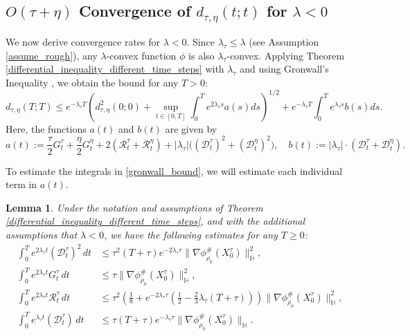 \documentclass[11pt,a4paper]{amsart}
\newcommand{\1}{\mathds{1}}
\newtheorem{lemma}[theorem]{\textbf{Lemma}}
\numberwithin{equation}{section}
\begin{document}
\subsection{ $O(\tau + \eta)$ Convergence of $d_{\tau,\eta}(t;t)$ for $\lambda < 0$ }

We now derive convergence rates for $\lambda < 0$. Since $\lambda_{\tau} \leq \lambda$ (see Assumption \ref{assume_rough}), any $\lambda$-convex function $\phi$ is also $\lambda_{\tau}$-convex. Applying Theorem \ref{differential_inequality_different_time_steps} with $\lambda_{\tau}$ and using Gronwall’s Inequality \cite[Lemma 4.1.8]{ambrosio2005gradient}, we obtain the bound  
for any $T > 0$:  
\begin{equation}
    d_{\tau,\eta}(T;T) \leq e^{- \lambda_{\tau} T} \left( d^2_{\tau,\eta}(0;0) + \sup_{t \in [0,T]} \int_0^T e^{2 \lambda_{\tau} s} a(s) ds \right)^{1/2} 
    + e^{- \lambda_{\tau} T}\int_0^T e^{\lambda_{\tau} s} b(s) ds.
    \label{gronwall_bound}
\end{equation}
Here, the functions $a(t)$ and $b(t)$ are given by  
\[
a(t) :=  \frac{\tau}{2}  G^{\tau}_t + \frac{\eta}{2} G^{\eta}_t  + 2( \mathcal{R}_t^{\tau} + \mathcal{R}_t^{\eta}) + |\lambda_{\tau}| \big( (\mathcal{D}_t^{\tau})^2 + (\mathcal{D}_t^{\eta})^2 \big),
\quad
b(t) := |\lambda_{\tau}| \cdot(\mathcal{D}_t^{\tau} + \mathcal{D}_t^{\eta}).
\]



To estimate the integrals in \eqref{gronwall_bound}, we will estimate each individual term in $a(t)$.

\begin{lemma} \label{estimates_lambda_negative}
Under the notation and assumptions of Theorem \ref{differential_inequality_different_time_steps}, and with the additional assumptions that $\lambda < 0$, we have the following estimates for any $T \geq 0$:
\begin{equation}
\begin{aligned}
    \int_0^T e^{2 \lambda_{\tau} t} (\mathcal{D}_t^{\tau})^2 \,dt 
    &\leq \tau^2 (T+\tau) e^{-2 \lambda_{\tau} \tau} \|\nabla \phi^{\#}_{\rho_0}(X_0^{\tau})\|^2_{\mathbb{H}},  
    \label{distance_squared_bound} \\
    \int_0^T e^{2 \lambda_{\tau} t} G_t^{\tau} \,dt 
    &\leq \tau \|\nabla \phi^{\#}_{\rho_0}(X_0^{\tau})\|^2_{\mathbb{H}}, \\
    \int_0^T e^{2 \lambda_{\tau} t} \mathcal{R}^{\tau}_t \,dt 
    &\leq \tau^2\left( \frac{1}{8} + e^{-2 \lambda_{\tau} \tau} \left( \frac{1}{2} - \frac{2}{3} \lambda_{\tau}(T+\tau) \right) \right) 
    \|\nabla \phi^{\#}_{\rho_0}(X^{\tau}_0)\|^2_{\mathbb{H}}, \\ 
    \int_0^T e^{\lambda_{\tau} t} (\mathcal{D}_t^{\tau}) \,dt 
    &\leq \tau (T+\tau) e^{-\lambda_{\tau} \tau} \|\nabla \phi^{\#}_{\rho_0}(X_0^{\tau})\|_{\mathbb{H}}.
\end{aligned}
\end{equation}

\end{lemma}
\end{document}
